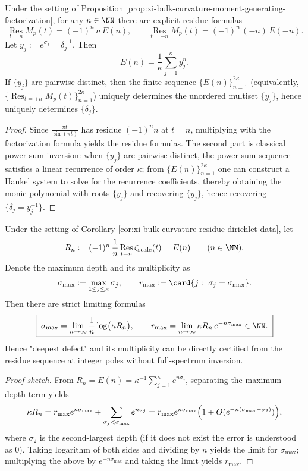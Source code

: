 \begin{corollary}\label{cor:xi-bulk-curvature-residue-dirichlet-data}
Under the setting of Proposition \ref{prop:xi-bulk-curvature-moment-generating-factorization}, for any \(n\in\NN\) there are explicit residue formulas
\[
\boxed{\;
\operatorname*{Res}_{t=n}M_p(t)=(-1)^n\,n\,E(n),\qquad
\operatorname*{Res}_{t=-n}M_p(t)=(-1)^n\,(-n)\,E(-n).\;}
\]
Let \(y_j:=e^{\sigma_j}=\delta_j^{-1}\).
Then
\[
E(n)=\frac{1}{\kappa}\sum_{j=1}^{\kappa}y_j^{n}.
\]
If \(\{y_j\}\) are pairwise distinct, then the finite sequence \(\{E(n)\}_{n=1}^{2\kappa}\) (equivalently, \(\{\operatorname*{Res}_{t=\pm n}M_p(t)\}_{n=1}^{2\kappa}\)) uniquely determines the unordered multiset \(\{y_j\}\), hence uniquely determines \(\{\delta_j\}\).
\end{corollary}
\begin{proof}
Since
\(
\frac{\pi t}{\sin(\pi t)}
\)
has residue \((-1)^n n\) at \(t=n\), multiplying with the factorization formula yields the residue formulas.
The second part is classical power-sum inversion: when \(\{y_j\}\) are pairwise distinct, the power sum sequence satisfies a linear recurrence of order \(\kappa\);
from \(\{E(n)\}_{n=1}^{2\kappa}\) one can construct a Hankel system to solve for the recurrence coefficients, thereby obtaining the monic polynomial with roots \(\{y_j\}\) and recovering \(\{y_j\}\), hence recovering \(\{\delta_j=y_j^{-1}\}\).
\end{proof}


\begin{corollary}\label{cor:xi-bulk-curvature-residue-extremal-recovery}
Under the setting of Corollary \ref{cor:xi-bulk-curvature-residue-dirichlet-data}, let
\[
R_n:=(-1)^n\,\frac{1}{n}\operatorname*{Res}_{t=n}\zeta_{\mathrm{scale}}(t)=E(n)\qquad(n\in\NN).
\]
Denote the maximum depth and its multiplicity as
\[
\sigma_{\max}:=\max_{1\le j\le\kappa}\sigma_j,
\qquad
r_{\max}:=\card\{j:\ \sigma_j=\sigma_{\max}\}.
\]
Then there are strict limiting formulas
\[
\boxed{\;
\sigma_{\max}=\lim_{n\to\infty}\frac{1}{n}\log\bigl(\kappa R_n\bigr),\qquad
r_{\max}=\lim_{n\to\infty}\kappa R_n\,e^{-n\sigma_{\max}}\in\NN.\;}
\]
Hence "deepest defect" and its multiplicity can be directly certified from the residue sequence at integer poles without full-spectrum inversion.
\end{corollary}
\begin{proof}[Proof sketch]
From \(R_n=E(n)=\kappa^{-1}\sum_{j=1}^{\kappa}e^{n\sigma_j}\), separating the maximum depth term yields
\[
\kappa R_n=r_{\max}e^{n\sigma_{\max}}+\sum_{\sigma_j<\sigma_{\max}}e^{n\sigma_j}
=r_{\max}e^{n\sigma_{\max}}\Bigl(1+O(e^{-n(\sigma_{\max}-\sigma_2)})\Bigr),
\]
where \(\sigma_2\) is the second-largest depth (if it does not exist the error is understood as \(0\)).
Taking logarithm of both sides and dividing by \(n\) yields the limit for \(\sigma_{\max}\); multiplying the above by \(e^{-n\sigma_{\max}}\) and taking the limit yields \(r_{\max}\).
\end{proof}

